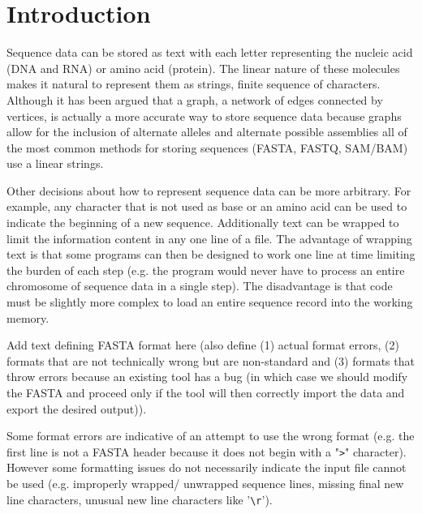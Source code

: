 \section{Introduction}

Sequence data can be stored as text with each letter representing the nucleic acid (DNA and RNA) or amino acid (protein). The linear nature of these molecules makes it natural to represent them as strings, finite sequence of characters. Although it has been argued that a graph, a network of edges connected by vertices, is actually a more accurate way to store sequence data because graphs allow for the inclusion of alternate alleles and alternate possible assemblies \cite{jaffe2012fastg} all of the most common methods for storing sequences (FASTA, FASTQ, SAM/BAM) use a linear strings.

Other decisions about how to represent sequence data can be more arbitrary. For example, any character that is not used as base or an amino acid can be used to indicate the beginning of a new sequence. Additionally text can be wrapped to limit the information content in any one line of a file. The advantage of wrapping text is that some programs can then be designed to work one line at time limiting the burden of each step (e.g. the program would never have to process an entire chromosome of sequence data in a single step). The disadvantage is that code must be slightly more complex to load an entire sequence record into the working memory.

Add text defining FASTA format here (also define (1) actual format errors, (2) formats that are not technically wrong but are non-standard and (3) formats that throw errors because an existing tool has a bug (in which case we should modify the FASTA and proceed only if the tool will then correctly import the data and export the desired output)).

Some format errors are indicative of an attempt to use the wrong format (e.g. the first line is not a FASTA header because it does not begin with a "\verb|>|" character). However some formatting issues do not necessarily indicate the input file cannot be used (e.g. improperly wrapped/ unwrapped sequence lines, missing final new line characters, unusual new line characters like '\verb|\r|').
  
  
  
  
  